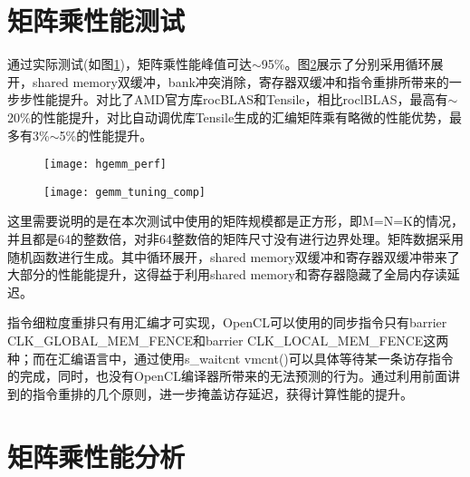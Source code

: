 \section{矩阵乘性能测试}
通过实际测试(如图\ref{fig:hgemm_perf})，矩阵乘性能峰值可达$\sim$95\%。图\ref{fig:gemm_tuning_comp}展示了分别采用循环展开，shared memory双缓冲，bank冲突消除，寄存器双缓冲和指令重排所带来的一步步性能提升。对比了AMD官方库rocBLAS和Tensile，相比roclBLAS，最高有$\sim$20\%的性能提升，对比自动调优库Tensile生成的汇编矩阵乘有略微的性能优势，最多有3\%$\sim$5\%的性能提升。
\begin{figure}[htbp]
	\centering
	\texttt{[image: hgemm\_perf]}
	\label{fig:hgemm_perf}
\end{figure}
\begin{figure}[htbp]
	\centering
	\texttt{[image: gemm\_tuning\_comp]}
	\label{fig:gemm_tuning_comp}
\end{figure}
这里需要说明的是在本次测试中使用的矩阵规模都是正方形，即M=N=K的情况，并且都是64的整数倍，对非64整数倍的矩阵尺寸没有进行边界处理。矩阵数据采用随机函数进行生成。其中循环展开，shared memory双缓冲和寄存器双缓冲带来了大部分的性能能提升，这得益于利用shared memory和寄存器隐藏了全局内存读延迟。

指令细粒度重排只有用汇编才可实现，OpenCL可以使用的同步指令只有barrier CLK\_GLOBAL\_MEM\_FENCE和barrier CLK\_LOCAL\_MEM\_FENCE这两种；而在汇编语言中，通过使用s\_waitcnt vmcnt()可以具体等待某一条访存指令的完成，同时，也没有OpenCL编译器所带来的无法预测的行为。通过利用前面讲到的指令重排的几个原则，进一步掩盖访存延迟，获得计算性能的提升。


\section{矩阵乘性能分析}
